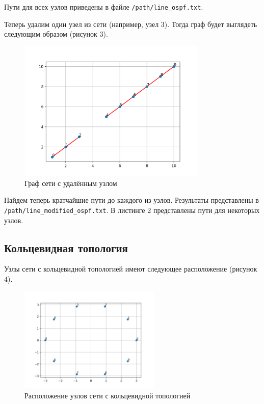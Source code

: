 \documentclass[a4paper,14pt]{extarticle}
\begin{document}


Пути для всех узлов приведены в файле \texttt{/path/line\_ospf.txt}.

Теперь удалим один узел из сети (например, узел 3). Тогда граф будет выглядеть следующим образом (рисунок 3).

\begin{figure}[htbp]
    \centering
    \includegraphics[width=0.8\textwidth]{img/line_modified.png}
    \caption{Граф сети с удалённым узлом}
    \label{fig:hamiltonianGraph}
\end{figure}

Найдем теперь кратчайшие пути до каждого из узлов. Результаты представлены в \texttt{/path/line\_modified\_ospf.txt}. В листинге 2 представлены пути для некоторых узлов.



\subsection{Кольцевидная топология}

Узлы сети с кольцевидной топологией имеют следующее расположение (рисунок 4).
\clearpage
\begin{figure}[htbp]
    \centering
    \includegraphics[width=0.6\textwidth]{img/ring_points.png}
    \caption{Расположение узлов сети с кольцевидной топологией}
    \label{fig:hamiltonianGraph}
\end{figure}
\end{document}
